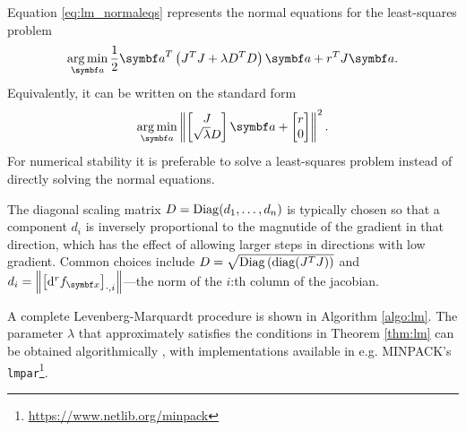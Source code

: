 Equation \eqref{eq:lm_normaleqs} represents the normal equations for the least-squares problem
\begin{equation}
  \argmin_{\a} \frac{1}{2} \a^T \left( J^T J + \lambda D^T D \right) \a + r^T J \a.
\end{equation}
Equivalently, it can be written on the standard form
\begin{equation}
  \label{eq:lm_lsq}
  \argmin_{\a} \left\| \begin{bmatrix}
    J \\ \sqrt{\lambda} D
  \end{bmatrix} \a + \begin{bmatrix}
    r \\ 0
  \end{bmatrix} \right\|^2.
\end{equation}
For numerical stability it is preferable to solve a least-squares problem instead of directly solving the normal equations.

The diagonal scaling matrix $D = \operatorname{Diag} (d_1, \ldots, d_n)$ is typically chosen so that a component $d_i$ is inversely proportional to the magnutide of the gradient in that direction, which has the effect of allowing larger steps in directions with low gradient. Common choices include $D = \sqrt{\operatorname{Diag} \left(\operatorname{diag}(J^T J) \right)}$ and $d_i = \left\| \left[ \mathrm{d}^r f_\x \right]_{\cdot, i} \right\|$---the norm of the $i$:th column of the jacobian.

A complete Levenberg-Marquardt procedure is shown in Algorithm \ref{algo:lm}. The parameter $\lambda$ that approximately satisfies the conditions in Theorem \ref{thm:lm} can be obtained algorithmically \cite{nocedal_numerical_2006,watson_levenberg-marquardt_1978}, with implementations available in e.g. MINPACK's \texttt{lmpar}\footnote{\url{https://www.netlib.org/minpack}}.

